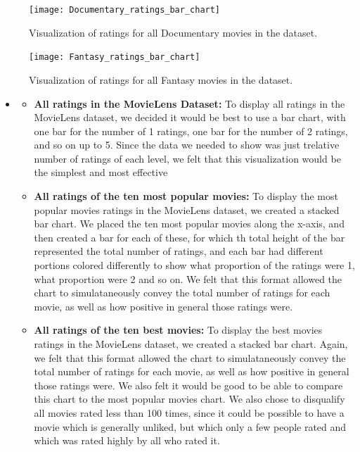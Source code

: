 \begin{figure}[H]
\centering
\texttt{[image: Documentary\_ratings\_bar\_chart]}
\caption{Visualization of ratings for all Documentary movies in the dataset.}
\end{figure}


\pagebreak

\begin{figure}[H]
\centering
\texttt{[image: Fantasy\_ratings\_bar\_chart]}
\caption{Visualization of ratings for all Fantasy movies in the dataset.}
\end{figure}

\begin{itemize}


    \item {}
    \begin{itemize}
    \item \textbf{All ratings in the MovieLens Dataset:} To display all ratings in the MovieLens dataset, we decided it would be best to use a bar chart, with one bar for the number of 1 ratings, one bar for the number of 2 ratings, and so on up to 5. Since the data we needed to show was just t\pagebreakhe relative number of ratings of each level, we felt that this visualization would be the simplest and most effective

    \item \textbf{All ratings of the ten most popular movies:} To display the most popular movies ratings in the MovieLens dataset, we created a stacked bar chart. We placed the ten most popular movies along the x-axis, and then created a bar for each of these, for which th total height of the bar represented the total number of ratings, and each bar had different portions colored differently to show what proportion of the ratings were 1, what proportion were 2 and so on. We felt that this format allowed the chart to simulataneously convey the total number of ratings for each movie, as well as how positive in general those ratings were.

    \item \textbf{All ratings of the ten best movies:} To display the best movies ratings in the MovieLens dataset, we created a stacked bar chart. Again, we felt that this format allowed the chart to simulataneously convey the total number of ratings for each movie, as well as how positive in general those ratings were. We also felt it would be good to be able to compare this chart to the most popular movies chart. We also chose to disqualify all movies rated less than 100 times, since it could be possible to have a movie which is generally unliked, but which only a few people rated and which was rated highly by all who rated it.


\end{itemize}
\end{itemize}
